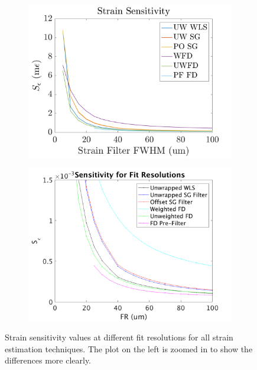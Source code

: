 \begin{figure}[b!]
	\centering
    \begin{subfigure}{0.49\textwidth}
    	\centering
        \includegraphics[width=\textwidth]{figures/sensitivity_lr0.png}
    \end{subfigure}
    \begin{subfigure}{0.49\textwidth}
    	\centering
        \includegraphics[width=\textwidth]{figures/sensitivity_lr0_zoom.png}
    \end{subfigure}
    \caption{Strain sensitivity values at different fit resolutions for all strain estimation techniques. The plot on the left is zoomed in to show the differences more clearly.}
	\label{sensitivity_1}
\end{figure}

